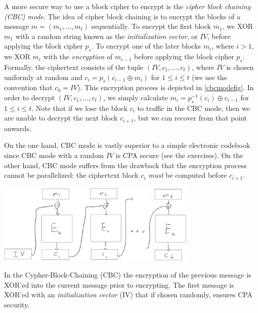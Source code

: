 A more secure way to use a block cipher to encrypt is the \emph{cipher
block chaining (CBC) mode}. The idea of cipher block chaining is to
encrypt the blocks of a message \(m = (m_1, \ldots, m_t)\) sequentially.
To encrypt the first block \(m_1\), we XOR \(m_1\) with a random string
known as the \emph{initialization vector}, or
\(\ensuremath{\mathit{IV}}\), before applying the block cipher \(p_s\).
To encrypt one of the later blocks \(m_i\), where \(i > 1\), we XOR
\(m_i\) with the \emph{encryption} of \(m_{i-1}\) before applying the
block cipher \(p_s\). Formally, the ciphertext consists of the tuple
\((\ensuremath{\mathit{IV}}, c_1, \ldots, c_t)\), where
\(\ensuremath{\mathit{IV}}\) is chosen uniformly at random and
\(c_i = p_s(c_{i-1} \oplus m_i)\) for \(1 \le i \le t\) (we use the
convention that \(c_0 = \ensuremath{\mathit{IV}}\)). This encryption
process is depicted in \cref{cbcmodefig}. In order to decrypt
\((\ensuremath{\mathit{IV}}, c_1, \ldots, c_t)\), we simply calculate
\(m_i = p_s^{-1}(c_i) \oplus c_{i-1}\) for \(1 \le i \le t\). Note that
if we lose the block \(c_i\) to traffic in the CBC mode, then we are
unable to decrypt the next block \(c_{i+1}\), but we can recover from
that point onwards.

On the one hand, CBC mode is vastly superior to a simple electronic
codebook since CBC mode with a random \(\ensuremath{\mathit{IV}}\) is
CPA secure (see the exercises). On the other hand, CBC mode suffers from
the drawback that the encryption process cannot be parallelized: the
ciphertext block \(c_i\) \emph{must} be computed before \(c_{i+1}\).


\begin{marginfigure}
\centering
\includegraphics[width=\linewidth, height=1.5in, keepaspectratio]{../figure/cbc-mode.jpg}
\caption{In the Cypher-Block-Chaining (CBC) the encryption of the
previous message is XOR'ed into the current message prior to encrypting.
The first message is XOR'ed with an \emph{initialization vector} (IV)
that if chosen randomly, ensures CPA security.}
\label{cbcmodefig}
\end{marginfigure}

